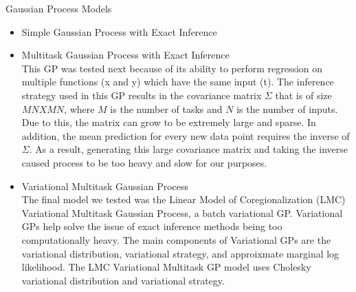 Gaussian Process Models
\begin{itemize}
    \item Simple Gaussian Process with Exact Inference \\
    \item Multitask Gaussian Process with Exact Inference \\ 
    This GP was tested next because of its ability to perform regression on multiple functions (x and y) which have the same input (t). The inference strategy used in this GP results in the covariance matrix $\Sigma$ that is of size $MN X MN$, where $M$ is the number of tasks and $N$ is the number of inputs. Due to this, the matrix can grow to be extremely large and sparse. In addition, the mean prediction for every new data point requires the inverse of $\Sigma$. As a result, generating this large covariance matrix and taking the inverse caused process to be too heavy and slow for our purposes. 
    \item Variational Multitask Gaussian Process \\
    The final model we tested was the Linear Model of Coregionalization (LMC) Variational Multitask Gaussian Process, a batch variational GP. Variational GPs help solve the issue of exact inference methods being too computationally heavy. The main components of Variational GPs are the variational distribution, variational strategy, and approixmate marginal log likelihood. The LMC Variational Multitask GP model uses Cholesky variational distribution and variational strategy. 
    
    
\end{itemize}